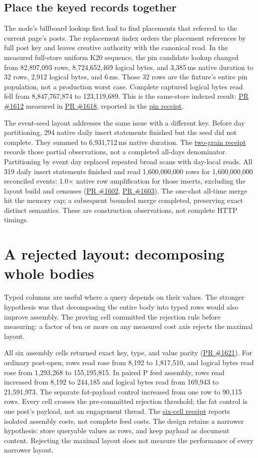 \documentclass[sigconf,nonacm]{acmart}
\newcommand{\pr}[1]{\href{https://github.com/jacoby149/web10/pull/#1}{PR \##1}}
\newcommand{\record}[2]{\href{https://github.com/jacoby149/web10/blob/2f397cb13/research/experiments/costfn/#1}{#2}}
\begin{document}
\subsection{Place the keyed records together}
The node's billboard lookup first had to find placements that referred to the current page's posts. The replacement index orders the placement references by full post key and leaves creative authority with the canonical read. In the measured full-store uniform K20 sequence, the pin candidate lookup changed from 82,897,093 rows, 8,724,652,469 logical bytes, and 3,385\,ms native duration to 32 rows, 2,912 logical bytes, and 6\,ms. Those 32 rows are the fixture's entire pin population, not a production worst case. Complete captured logical bytes read fell from 8,847,767,874 to 123,119,689. This is the same-store indexed result: \pr{1612} measured in \pr{1618}, reported in the \record{evidence/skinny-pin-20261122/RESULTS.md}{pin receipt}.

The event-seed layout addresses the same issue with a different key. Before day partitioning, 294 native daily insert statements finished but the seed did not complete. They summed to 6,931,712\,ms native duration. The \record{evidence/all-fixes-two-grain-20261120/RESULTS.md}{two-grain receipt} records those partial observations, not a completed all-days denominator. Partitioning by event day replaced repeated broad scans with day-local reads. All 319 daily insert statements finished and read 1,600,000,000 rows for 1,600,000,000 reconciled events: 1.0$\times$ native row amplification for those inserts, excluding the layout build and censuses (\pr{1602}, \pr{1603}). The one-shot all-time merge hit the memory cap; a subsequent bounded merge completed, preserving exact distinct semantics. These are construction observations, not complete HTTP timings.

\section{A rejected layout: decomposing whole bodies}
Typed columns are useful where a query depends on their values. The stronger hypothesis was that decomposing the entire body into typed rows would also improve assembly. The proving cell committed the rejection rule before measuring: a factor of ten or more on any measured cost axis rejects the maximal layout.

All six assembly cells returned exact key, type, and value parity (\pr{1621}). For ordinary post-open, rows read rose from 8,192 to 1,817,510, and logical bytes read rose from 1,293,268 to 155,195,815. In paired P feed assembly, rows read increased from 8,192 to 244,185 and logical bytes read from 169,943 to 21,591,973. The separate fat-payload control increased from one row to 90,115 rows. Every cell crosses the pre-committed rejection threshold; the fat control is one post's payload, not an engagement thread. The \record{evidence/row-model-4096-20261123/RESULTS.md}{six-cell receipt} reports isolated assembly costs, not complete feed costs. The design retains a narrower hypothesis: store queryable values as rows, and keep payload as document content. Rejecting the maximal layout does not measure the performance of every narrower layout.
\end{document}

